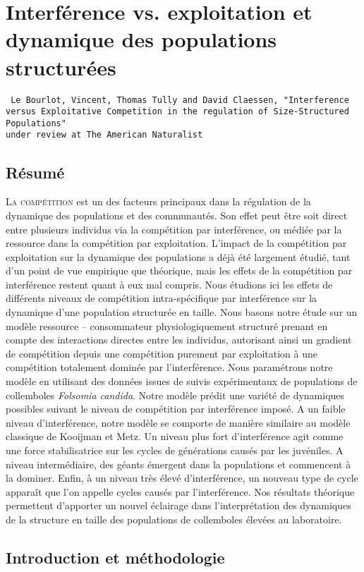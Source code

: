 \chapter[Interférence vs. exploitation et dynamique des populations
structurées][Interférence et populations structurées]{Interférence vs.
exploitation et dynamique des populations structurées}

\vspace{2cm}
\begin{Spacing}{1}
\texttt{
Le Bourlot, Vincent, Thomas Tully and David Claessen, "Interference versus
Exploitative Competition in the regulation of Size-Structured Populations"\\
under review at The American Naturalist
}
\end{Spacing}

\section*{Résumé}


\lettrine[lines=3]{L}{a compétition}  est un des facteurs principaux dans la
régulation de la dynamique des populations et des communautés. Son effet peut
être soit direct entre plusieurs individus via la compétition par
interférence, ou médiée par la ressource dans la compétition par
exploitation. L'impact de la compétition par exploitation sur la dynamique des
populations a déjà été largement étudié, tant d'un point de vue empirique
que théorique, mais les effets de la compétition par interférence restent
quant à eux mal compris. Nous étudions ici les effets de différents niveaux
de compétition intra-spécifique par interférence sur la dynamique d'une
population structurée en taille. Nous basons notre étude sur un modèle
ressource -- consommateur physiologiquement structuré prenant en compte des
interactions directes entre les individus, autorisant ainsi un gradient de
compétition depuis une compétition purement par exploitation à une
compétition totalement dominée par l'interférence. Nous paramétrons notre
modèle en utilisant des données issues de suivis expérimentaux de populations
de collemboles \textit{Folsomia candida}. Notre modèle prédit une variété de
dynamiques possibles suivant le niveau de compétition par interférence
imposé. A un faible niveau d'interférence, notre modèle se comporte de
manière similaire au modèle classique de Kooijman et Metz. Un niveau plus fort
d'interférence agit comme une force stabilisatrice sur les cycles de
générations causés par les juvéniles. A niveau intermédiaire, des géants
émergent dans la populations et commencent à la dominer. Enfin, à un niveau
très élevé d'interférence, un nouveau type de cycle apparaît que l'on
appelle cycles causés par l'interférence. Nos résultats théorique permettent
d'apporter un nouvel éclairage dans l'interprétation des dynamiques de la
structure en taille des populations de collemboles élevées au laboratoire.

\section{Introduction et méthodologie}

